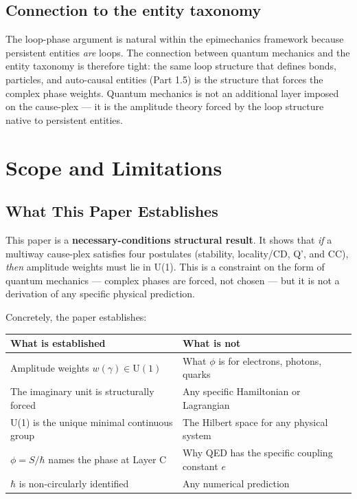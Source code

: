 \documentclass[11pt]{article}
\theoremstyle{definition}
\theoremstyle{remark}
\begin{document}
\subsection{Connection to the entity
taxonomy}\label{connection-to-the-entity-taxonomy}

The loop-phase argument is natural within the epimechanics framework
because persistent entities \emph{are} loops. The connection between
quantum mechanics and the entity taxonomy is therefore tight: the same
loop structure that defines bonds, particles, and auto-causal entities
(Part 1.5) is the structure that forces the complex phase weights.
Quantum mechanics is not an additional layer imposed on the cause-plex
--- it is the amplitude theory forced by the loop structure native to
persistent entities.

\medskip

\section{Scope and Limitations}\label{scope-and-limitations}

\subsection{What This Paper
Establishes}\label{what-this-paper-establishes}

This paper is a \textbf{necessary-conditions structural result}. It
shows that \emph{if} a multiway cause-plex satisfies four postulates
(stability, locality/CD, Q', and CC), \emph{then} amplitude weights must
lie in U(1). This is a constraint on the form of quantum mechanics ---
complex phases are forced, not chosen --- but it is not a derivation of
any specific physical prediction.

Concretely, the paper establishes:

{\def\LTcaptype{none} %
\begin{longtable}[]{@{}
  >{\raggedright\arraybackslash}p{}
  >{\raggedright\arraybackslash}p{}@{}}
\toprule\noalign{}
\begin{minipage}[b]{\linewidth}\raggedright
What is established
\end{minipage} & \begin{minipage}[b]{\linewidth}\raggedright
What is not
\end{minipage} \\
\midrule\noalign{}
\endhead
\bottomrule\noalign{}
\endlastfoot
Amplitude weights \(w(\gamma) \in \mathrm{U}(1)\) & What \(\phi\) is for
electrons, photons, quarks \\
The imaginary unit is structurally forced & Any specific Hamiltonian or
Lagrangian \\
U(1) is the unique minimal continuous group & The Hilbert space for any
physical system \\
\(\phi = S/\hbar\) names the phase at Layer C & Why QED has the specific
coupling constant \(e\) \\
\(\hbar\) is non-circularly identified & Any numerical prediction \\
\end{longtable}
}
\end{document}
